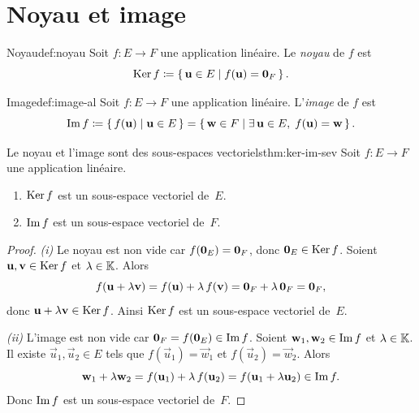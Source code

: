 \section{Noyau et image}\label{sec:noyau-image}

\begin{definition}{Noyau}{def:noyau}
  Soit $f\colon E\to F$ une application linéaire. Le \emph{noyau}%
   de $f$ est
  \[
    \operatorname{Ker} f\coloneqq\left\{\,\mathbf{u}\in E\;\middle|\;f(\mathbf{u})=\mathbf{0}_F\,\right\}.
  \]
\end{definition}

\begin{definition}{Image}{def:image-al}
  Soit $f\colon E\to F$ une application linéaire. L'\emph{image}%
   de $f$ est
  \[
    \operatorname{Im} f\coloneqq\left\{\,f(\mathbf{u})\;\middle|\;\mathbf{u}\in E\,\right\}
    =\left\{\,\mathbf{w}\in F\;\middle|\;\exists\,\mathbf{u}\in E,\;f(\mathbf{u})=\mathbf{w}\,\right\}.
  \]
\end{definition}

\begin{theorem}{Le noyau et l'image sont des sous-espaces vectoriels}{thm:ker-im-sev}
  Soit $f\colon E\to F$ une application linéaire.
  \begin{enumerate}[label=(\roman*)]
    \item $\operatorname{Ker} f$ est un sous-espace vectoriel de~$E$.
    \item $\operatorname{Im} f$ est un sous-espace vectoriel de~$F$.
  \end{enumerate}
\end{theorem}

\begin{proof}
  \emph{(i)} Le noyau est non vide car $f(\mathbf{0}_E)=\mathbf{0}_F$, donc
  $\mathbf{0}_E\in\operatorname{Ker} f$. Soient $\mathbf{u},\mathbf{v}\in\operatorname{Ker} f$ et
  $\lambda\in{\mathbb{K}}$. Alors
  \[
    f(\mathbf{u}+\lambda\mathbf{v})=f(\mathbf{u})+\lambda\,f(\mathbf{v})
    =\mathbf{0}_F+\lambda\,\mathbf{0}_F=\mathbf{0}_F,
  \]
  donc $\mathbf{u}+\lambda\mathbf{v}\in\operatorname{Ker} f$. Ainsi $\operatorname{Ker} f$ est un
  sous-espace vectoriel de~$E$.

  \emph{(ii)} L'image est non vide car $\mathbf{0}_F=f(\mathbf{0}_E)\in\operatorname{Im} f$.
  Soient $\mathbf{w}_1,\mathbf{w}_2\in\operatorname{Im} f$ et $\lambda\in{\mathbb{K}}$. Il existe
  $\vec{u}_1,\vec{u}_2\in E$ tels que $f(\vec{u}_1)=\vec{w}_1$ et
  $f(\vec{u}_2)=\vec{w}_2$. Alors
  \[
    \mathbf{w}_1+\lambda\mathbf{w}_2=f(\mathbf{u}_1)+\lambda\,f(\mathbf{u}_2)
    =f(\mathbf{u}_1+\lambda\mathbf{u}_2)\in\operatorname{Im} f.
  \]
  Donc $\operatorname{Im} f$ est un sous-espace vectoriel de~$F$.
\end{proof}

